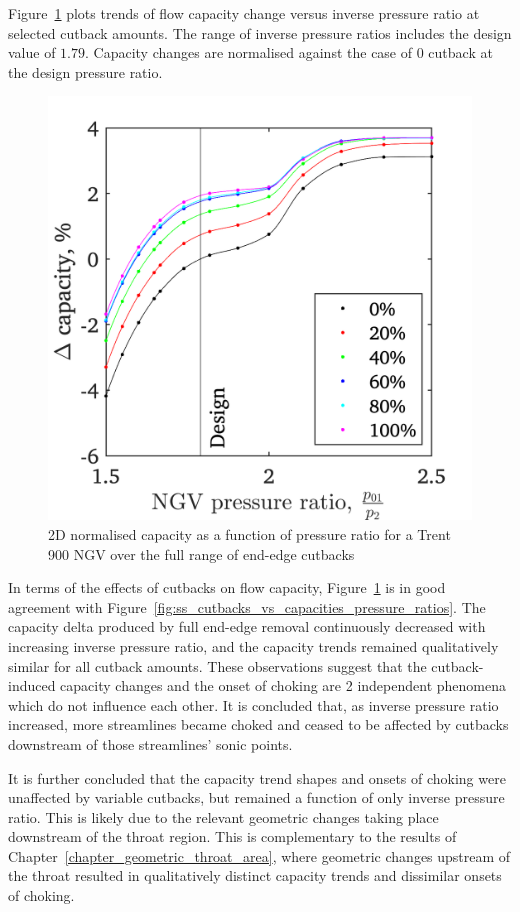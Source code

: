 \documentclass[a4paper, 11pt, oneside]{report}
\begin{document}
Figure~\ref{fig:ss_cutbacks_vs_capacities_trends} plots trends of flow capacity change versus inverse pressure ratio at selected cutback amounts. The range of inverse pressure ratios includes the design value of $1.79$. Capacity changes are normalised against the case of $0$ cutback at the design pressure ratio.

\begin{figure}[H]
	\centering
	\includegraphics[width=.45\textwidth]{figs/ss_cutbacks_vs_capacities_trends.png}
	\caption{2D normalised capacity as a function of pressure ratio for a Trent 900 NGV over the full range of end-edge cutbacks}
    \label{fig:ss_cutbacks_vs_capacities_trends}
\end{figure}

In terms of the effects of cutbacks on flow capacity, Figure~\ref{fig:ss_cutbacks_vs_capacities_trends} is in good agreement with Figure~\ref{fig:ss_cutbacks_vs_capacities_pressure_ratios}. The capacity delta produced by full end-edge removal continuously decreased with increasing inverse pressure ratio, and the capacity trends remained qualitatively similar for all cutback amounts. These observations suggest that the cutback-induced capacity changes and the onset of choking are 2 independent phenomena which do not influence each other. It is concluded that, as inverse pressure ratio increased, more streamlines became choked and ceased to be affected by cutbacks downstream of those streamlines' sonic points. 

It is further concluded that the capacity trend shapes and onsets of choking were unaffected by variable cutbacks, but remained a function of only inverse pressure ratio. This is likely due to the relevant geometric changes taking place downstream of the throat region. This is complementary to the results of Chapter~\ref{chapter_geometric_throat_area}, where geometric changes upstream of the throat resulted in qualitatively distinct capacity trends and dissimilar onsets of choking.
\end{document}
